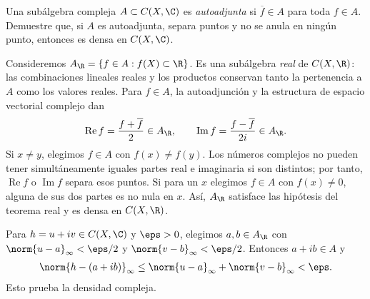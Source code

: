 \begin{ejercicio}
Una subálgebra compleja $A\subset C(X,\C)$ es \emph{autoadjunta} si $\overline f\in A$ para toda $f\in A$. Demuestre que, si $A$ es autoadjunta, separa puntos y no se anula en ningún punto, entonces es densa en $C(X,\C)$.
\end{ejercicio}
\begin{solucion}
Consideremos $A_\R=\{f\in A:f(X)\subset\R\}$. Es una subálgebra \emph{real} de $C(X,\R)$: las combinaciones lineales reales y los productos conservan tanto la pertenencia a $A$ como los valores reales. Para $f\in A$, la autoadjunción y la estructura de espacio vectorial complejo dan
\[
 \operatorname{Re}f=\frac{f+\overline f}{2}\in A_\R,
 \qquad\operatorname{Im}f=\frac{f-\overline f}{2i}\in A_\R.
\]
Si $x\ne y$, elegimos $f\in A$ con $f(x)\ne f(y)$. Los números complejos no pueden tener simultáneamente iguales partes real e imaginaria si son distintos; por tanto, $\operatorname{Re}f$ o $\operatorname{Im}f$ separa esos puntos. Si para un $x$ elegimos $f\in A$ con $f(x)\ne0$, alguna de sus dos partes es no nula en $x$. Así, $A_\R$ satisface las hipótesis del teorema real y es densa en $C(X,\R)$.

Para $h=u+iv\in C(X,\C)$ y $\eps>0$, elegimos $a,b\in A_\R$ con $\norm{u-a}_\infty<\eps/2$ y $\norm{v-b}_\infty<\eps/2$. Entonces $a+ib\in A$ y
\[
 \norm{h-(a+ib)}_\infty\le\norm{u-a}_\infty+\norm{v-b}_\infty<\eps.
\]
Esto prueba la densidad compleja.
\end{solucion}

